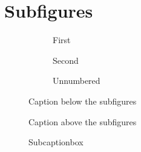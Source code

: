 \expandafter\documentclass\expandafter[\CLSOPT]{\CLS}
\begin{document}
\section*{Subfigures}

\SCLsep{\SCLkind}

\begin{figure}[htbp]
  \centering
  \begin{subfigure}{.3\linewidth}
    \centering\SCLimage{2cm}{1.5cm}
    \caption{First}%
    \label{fig:first-a}
  \end{subfigure}\hfill
  \begin{subfigure}{.3\linewidth}
    \centering\SCLimage{2cm}{1.5cm}
    \caption{Second}
  \end{subfigure}\hfill
  \begin{subfigure}{.3\linewidth}
    \centering\SCLimage{2cm}{1.5cm}
    \caption*{Unnumbered}
  \end{subfigure}
  \caption{Caption below the subfigures}\label{fig:first}
\end{figure}

\begin{figure}[htbp]
  \centering
  \caption{Caption above the subfigures}
  \begin{minipage}{.4\linewidth}
    \centering\SCLimage{2cm}{1cm}
  \end{minipage}\hfill
  \begin{minipage}{.4\linewidth}
    \centering\SCLimage{2cm}{1cm}
  \end{minipage}
\end{figure}

\begin{figure}[htbp]
  \centering
  \hfill
  \hfill
  \hfill
  \caption{Subcaptionbox}
\end{figure}
\end{document}
